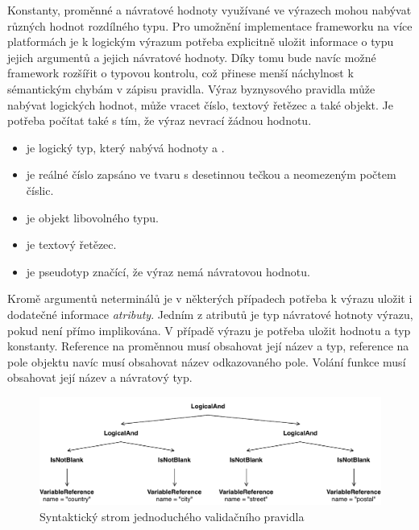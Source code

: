Konstanty, proměnné a návratové hodnoty využívané ve výrazech mohou nabývat
různých hodnot rozdílného typu. Pro umožnění implementace frameworku na více platformách je
k logickým výrazum potřeba explicitně uložit informace o typu jejich argumentů a jejich návratové hodnoty.
Díky tomu bude navíc možné framework rozšířit o typovou kontrolu, což přinese menší náchylnost
k sémantickým chybám v zápisu pravidla. Výraz byznysového pravidla může nabývat logických hodnot,
může vracet číslo, textový řetězec a také objekt. Je potřeba počítat také s tím, že výraz nevrací žádnou
hodnotu.

\begin{itemize}
    \item {} je logický typ, který nabývá hodnoty  a .
    \item {} je reálné číslo zapsáno ve tvaru s desetinnou tečkou a neomezeným počtem číslic.
    \item {} je objekt libovolného typu.
    \item {} je textový řetězec.
    \item {} je pseudotyp značící, že výraz nemá návratovou hodnotu.
\end{itemize}

Kromě argumentů neterminálů je v některých případech potřeba k výrazu uložit i dodatečné informace \textendash\xspace
\textit{atributy}. Jedním z atributů je typ návratové hotnoty výrazu, pokud není přímo implikována.
V případě výrazu  je potřeba uložit hodnotu a typ konstanty. Reference na proměnnou
musí obsahovat její název a typ, reference na pole objektu navíc musí obsahovat název odkazovaného pole.
Volání funkce musí obsahovat její název a návratový typ.

\begin{figure}
    \centering
    \includegraphics[keepaspectratio=true, width=1\linewidth]{figures/simple-rule.pdf}
    \caption{Syntaktický strom jednoduchého validačního pravidla}
    \label{fig:simple-rule}
\end{figure}

